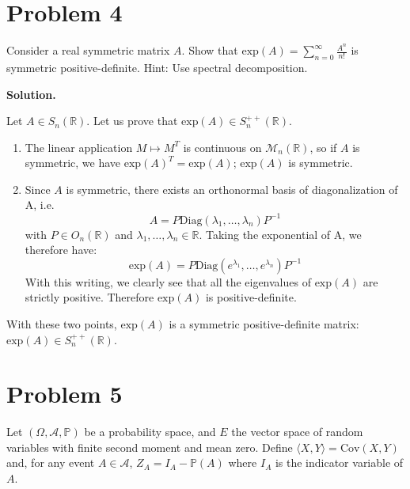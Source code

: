\documentclass[12pt]{article}
\newcommand{\R}{\mathbb{R}}
\newcommand{\Exp}[1]{\text{exp}(#1)}
\newcommand{\Diag}[1]{\text{Diag}(#1)}
\newcommand{\Cov}[1]{\text{Cov}(#1)}
\newenvironment{solution}{\vspace{0.2cm} \textbf{Solution.}}{}
\begin{document}
\newpage

	\section*{Problem 4}
Consider a real symmetric matrix $A$. Show that $\Exp{A} = \sum_{n=0}^{\infty} \frac{A^n}{n!}$ is symmetric positive-definite.
Hint: Use spectral decomposition.

	\begin{solution}
		
	Let $A \in S_n(\R)$. Let us prove that $\Exp{A} \in S_n^{++}(\R)$.
	\begin{enumerate}[label={\arabic*.}]
		\item The linear application $M \mapsto M^T$ is continuous on $\mathcal{M}_n(\R)$, so if $A$ is symmetric, we have $\Exp{A}^T = \Exp{A}$; $\Exp{A}$ is symmetric.
		\item Since $A$ is symmetric, there exists an orthonormal basis of diagonalization of A, i.e.\:
		$$ A = P \Diag{\lambda_1, \ldots, \lambda_n} P^{-1}$$
		with $P \in O_n(\R)$ and $\lambda_1,\ldots,\lambda_n \in \R$.
		Taking the exponential of A, we therefore have:
		$$ \Exp{A} = P \Diag{e^{\lambda_1}, \ldots, e^{\lambda_n}} P^{-1}$$
		With this writing, we clearly see that all the eigenvalues of $\Exp{A}$ are strictly positive. Therefore $\Exp{A}$ is positive-definite.
	\end{enumerate}
	
	With these two points, $\Exp{A}$ is a symmetric positive-definite matrix: $\Exp{A} \in S_n^{++}(\R)$.
	\end{solution}
	
\newpage

	\section*{Problem 5}

Let $(\Omega, \mathcal{A}, \mathbb{P})$ be a probability space, and $E$ the vector space of random variables with finite second moment and mean zero. Define $\langle X, Y \rangle = \Cov{X, Y}$ and, for any event $A \in \mathcal{A}$, $Z_A = I_A - \mathbb{P}(A)$ where $I_A$ is the indicator variable of $A$.
\end{document}
